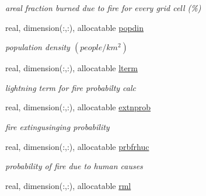 \begin{DoxyCompactItemize}
\begin{DoxyCompactList}\small\item\em areal fraction burned due to fire for every grid cell (\%) \end{DoxyCompactList}\item 
\hypertarget{structctem__statevars_1_1veg__rot_a3374079a476948bcc8b065d38ee02939}{}real, dimension(\+:,\+:), allocatable \hyperlink{structctem__statevars_1_1veg__rot_a3374079a476948bcc8b065d38ee02939}{popdin}\label{structctem__statevars_1_1veg__rot_a3374079a476948bcc8b065d38ee02939}

\begin{DoxyCompactList}\small\item\em population density $(people / km^2)$ \end{DoxyCompactList}\item 
\hypertarget{structctem__statevars_1_1veg__rot_a5652727ff038bb13b5be2279b5418dfd}{}real, dimension(\+:,\+:), allocatable \hyperlink{structctem__statevars_1_1veg__rot_a5652727ff038bb13b5be2279b5418dfd}{lterm}\label{structctem__statevars_1_1veg__rot_a5652727ff038bb13b5be2279b5418dfd}

\begin{DoxyCompactList}\small\item\em lightning term for fire probabilty calc \end{DoxyCompactList}\item 
\hypertarget{structctem__statevars_1_1veg__rot_ac3bc64976cb4deecb67382e92beb9e9b}{}real, dimension(\+:,\+:), allocatable \hyperlink{structctem__statevars_1_1veg__rot_ac3bc64976cb4deecb67382e92beb9e9b}{extnprob}\label{structctem__statevars_1_1veg__rot_ac3bc64976cb4deecb67382e92beb9e9b}

\begin{DoxyCompactList}\small\item\em fire extingusinging probability \end{DoxyCompactList}\item 
\hypertarget{structctem__statevars_1_1veg__rot_afa89837ee7001e7fa0b3be5ec3c6e6c9}{}real, dimension(\+:,\+:), allocatable \hyperlink{structctem__statevars_1_1veg__rot_afa89837ee7001e7fa0b3be5ec3c6e6c9}{prbfrhuc}\label{structctem__statevars_1_1veg__rot_afa89837ee7001e7fa0b3be5ec3c6e6c9}

\begin{DoxyCompactList}\small\item\em probability of fire due to human causes \end{DoxyCompactList}\item 
\hypertarget{structctem__statevars_1_1veg__rot_a285e423b0b1f7b52bfb9db3c775679d1}{}real, dimension(\+:,\+:), allocatable \hyperlink{structctem__statevars_1_1veg__rot_a285e423b0b1f7b52bfb9db3c775679d1}{rml}\label{structctem__statevars_1_1veg__rot_a285e423b0b1f7b52bfb9db3c775679d1}


\end{DoxyCompactItemize}
